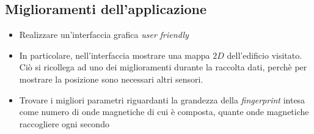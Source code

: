 \subsection{Miglioramenti dell'applicazione}
\begin{itemize}
	\item Realizzare un'interfaccia grafica \textit{user friendly}
	\item In particolare, nell'interfaccia mostrare una mappa $2D$ dell'edificio visitato. Ci\`o si ricollega ad uno dei miglioramenti durante la raccolta dati, perch\`e per mostrare la posizione sono necessari altri sensori.
	\item Trovare i migliori parametri riguardanti la grandezza della \textit{fingerprint} intesa come numero di onde magnetiche di cui \`e composta, quante onde magnetiche raccogliere ogni secondo
\end{itemize}
